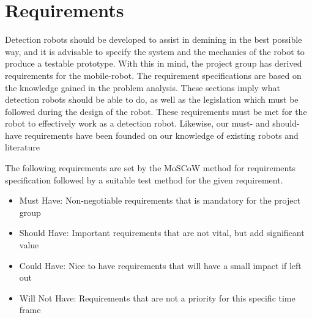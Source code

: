 
\chapter{Requirements}

Detection robots should be developed to assist in demining in the best possible way, and it is advisable to specify the system and the mechanics of the robot to produce a testable prototype. With this in mind, the project group has derived requirements for the mobile-robot. The requirement specifications are based on the knowledge gained in the problem analysis. These sections imply what detection robots should be able to do, as well as the legislation which must be followed during the design of the robot. These requirements must be met for the robot to effectively work as a detection robot. Likewise, our must- and should-have requirements have been founded on our knowledge of existing robots and literature\\

        \vspace{2mm}

The following requirements are set by the MoSCoW method for requirements specification followed by a suitable test method for the given requirement.

\begin{itemize}[label={}]
\setlength{\itemsep}{0.05\baselineskip}
    \item {} \normalsize Must Have: \hspace{5mm} Non-negotiable requirements that is mandatory for the project group \par
    \item {} \normalsize Should Have: \hspace{1.8mm} Important requirements that are not vital, but add significant value \par
    \item {} \normalsize Could Have: \hspace{3.5mm} Nice to have requirements that will have a small impact if left out \par
    \item {} \normalsize Will Not Have: Requirements that are not a priority for this specific time frame \par
\end{itemize}

